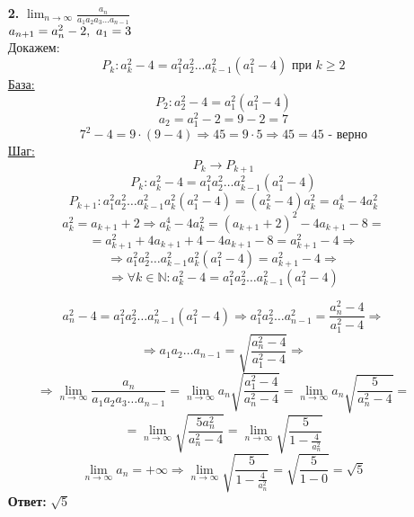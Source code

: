 \documentclass[a4paper]{article}
\renewcommand{\f}[2]{\frac{#1}{#2}}
\renewcommand{\r}{\Rightarrow}
\renewcommand{\geq}{\geqslant}
\newcommand{\NN}{\mathbb{N}}
\begin{document}
\begin{enumerate}
    \item[\textbf{2.}]
    $\lim_{n \to \infty}\f{a_n}{a_1a_2a_3\dots a_{n-1}}$\\
    $a_{n+1} = a_n^2-2, \text{\space} a_1 = 3$\\
    Докажем:\\
    $$P_k : a_k^2-4 = a_1^2a_2^2\dots a_{k-1}^2(a_1^2-4) \text{ при } k \geq 2$$
    \underline{База:}
    $$P_2: a_2^2-4 = a_1^2(a_1^2-4)$$
    $$a_2 = a_1^2-2 = 9-2 = 7$$
    $$7^2-4 = 9\cdot (9-4) \r 45 = 9 \cdot 5 \r 45 = 45 \text{ - верно}$$
    \underline{Шаг:}
    $$P_k \to P_{k+1}$$
    $$P_k: a_k^2-4 = a_1^2a_2^2\dots a_{k-1}^2(a_1^2-4)$$
    $$P_{k+1}: a_1^2a_2^2\dots a_{k-1}^2a_{k}^2(a_1^2-4) = (a_k^2-4)a_k^2 = a_k^4-4a_k^2$$
    $$a_k^2 = a_{k+1}+2 \r a_k^4-4a_k^2 = (a_{k+1}+2)^2-4a_{k+1}-8 = $$
    $$=a_{k+1}^2+4a_{k+1}+4 - 4a_{k+1} - 8 = a_{k+1}^2 - 4\r$$
    $$\r a_1^2a_2^2\dots a_{k-1}^2a_{k}^2(a_1^2-4) = a_{k+1}^2 - 4 \r $$
    $$\r \forall k \in \NN : a_k^2-4 = a_1^2a_2^2\dots a_{k-1}^2(a_1^2-4)$$

    $$a_n^2-4 = a_1^2a_2^2\dots a_{n-1}^2(a_1^2-4) \r a_1^2a_2^2\dots a_{n-1}^2 = \f{a_n^2-4}{a_1^2-4} \r$$
    $$\r a_1a_2\dots a_{n-1}= \sqrt{\f{a_n^2-4}{a_1^2-4}}\r$$
    $$\r \lim_{n \to \infty}\f{a_n}{a_1a_2a_3\dots a_{n-1}} = \lim_{n \to \infty}a_n\sqrt{\f{a_1^2-4}{a_n^2-4}} = \lim_{n \to \infty}a_n\sqrt{\f{5}{a_n^2-4}} =$$ 
    $$= \lim_{n \to \infty}\sqrt{\f{5a_n^2}{a_n^2-4}} = \lim_{n \to \infty}\sqrt{\f{5}{1-\f{4}{a_n^2}}}$$
    $$\lim_{n \to \infty}a_n = +\infty \r \lim_{n \to \infty}\sqrt{\f{5}{1-\f{4}{a_n^2}}} = \sqrt{\f{5}{1-0}} = \sqrt{5}$$
    \textbf{Ответ:} $\sqrt{5}$

\end{enumerate}
\end{document}
